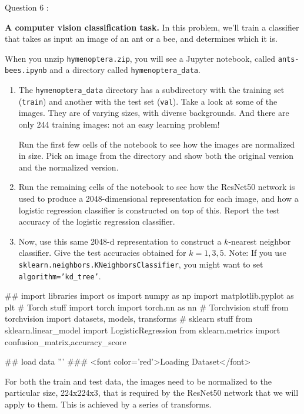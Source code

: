 Question 6 :     \item \textbf{A computer vision classification task.} In this problem, we'll train a classifier that takes as input an image of an ant or a bee, and determines which it is.

When you unzip \texttt{hymenoptera.zip}, you will see a Jupyter notebook, called \texttt{ants-bees.ipynb} and a directory called \texttt{hymenoptera\_data}.

\begin{enumerate}
    \item The \texttt{hymenoptera\_data} directory has a subdirectory with the training set (\texttt{train}) and another with the test set (\texttt{val}). Take a look at some of the images. They are of varying sizes, with diverse backgrounds. And there are only 244 training images: not an easy learning problem!

    Run the first few cells of the notebook to see how the images are normalized in size. Pick an image from the directory and show both the original version and the normalized version.

    \item Run the remaining cells of the notebook to see how the ResNet50 network is used to produce a 2048-dimensional representation for each image, and how a logistic regression classifier is constructed on top of this. Report the test accuracy of the logistic regression classifier.

    \item Now, use this same 2048-d representation to construct a $k$-nearest neighbor classifier. Give the test accuracies obtained for $k=1, 3, 5$. Note: If you use \texttt{sklearn.neighbors.KNeighborsClassifier}, you might want to set \texttt{algorithm='kd\_tree'}.
\end{enumerate}

## import libraries
import os
import numpy as np
import matplotlib.pyplot as plt
# Torch stuff
import torch
import torch.nn as nn
# Torchvision stuff
from torchvision import datasets, models, transforms
# sklearn stuff
from sklearn.linear_model import LogisticRegression
from sklearn.metrics import confusion_matrix,accuracy_score

## load data
'''
### <font color='red'>Loading Dataset</font>

For both the train and test data, the images need to be normalized to the particular size, 224x224x3, that is required by the ResNet50 network that we will apply to them. This is achieved by a series of transforms.

